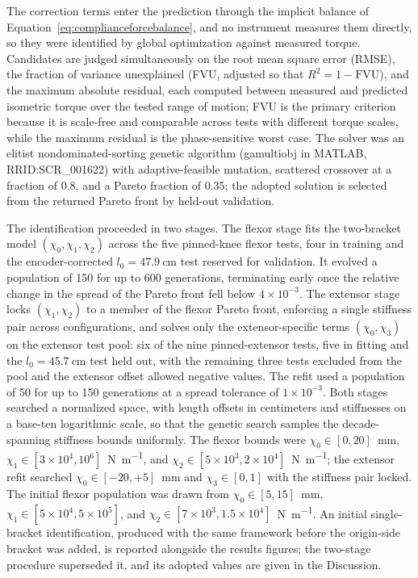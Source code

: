 The correction terms enter the prediction through the implicit balance of Equation~\eqref{eq:complianceforcebalance}, and no instrument measures them directly, so they were identified by global optimization against measured torque. Candidates are judged simultaneously on the root mean square error (RMSE), the fraction of variance unexplained (FVU, adjusted so that $R^{2} = 1 - \mathrm{FVU}$), and the maximum absolute residual, each computed between measured and predicted isometric torque over the tested range of motion; FVU is the primary criterion because it is scale-free and comparable across tests with different torque scales, while the maximum residual is the phase-sensitive worst case. The solver was an elitist nondominated-sorting genetic algorithm (gamultiobj in MATLAB, RRID:SCR\_001622) with adaptive-feasible mutation, scattered crossover at a fraction of 0.8, and a Pareto fraction of 0.35; the adopted solution is selected from the returned Pareto front by held-out validation.

The identification proceeded in two stages. The flexor stage fits the two-bracket model $(\chi_{0}, \chi_{1}, \chi_{2})$ across the five pinned-knee flexor tests, four in training and the encoder-corrected $l_{0}=\qty{47.9}{\cm}$ test reserved for validation. It evolved a population of 150 for up to 600 generations, terminating early once the relative change in the spread of the Pareto front fell below $4\times10^{-3}$. The extensor stage locks $(\chi_{1}, \chi_{2})$ to a member of the flexor Pareto front, enforcing a single stiffness pair across configurations, and solves only the extensor-specific terms $(\chi_{0}, \chi_{3})$ on the extensor test pool: six of the nine pinned-extensor tests, five in fitting and the $l_{0}=\qty{45.7}{\cm}$ test held out, with the remaining three tests excluded from the pool and the extensor offset allowed negative values. The refit used a population of 50 for up to 150 generations at a spread tolerance of $1\times10^{-3}$. Both stages searched a normalized space, with length offsets in centimeters and stiffnesses on a base-ten logarithmic scale, so that the genetic search samples the decade-spanning stiffness bounds uniformly. The flexor bounds were $\chi_{0} \in [0, 20]$~\si{\milli\metre}, $\chi_{1} \in [3\times10^{4}, 10^{6}]$~\si{\N\per\metre}, and $\chi_{2} \in [5\times10^{3}, 2\times10^{4}]$~\si{\N\per\metre}; the extensor refit searched $\chi_{0} \in [-20, +5]$~\si{\milli\metre} and $\chi_{3} \in [0, 1]$ with the stiffness pair locked. The initial flexor population was drawn from $\chi_{0} \in [5, 15]$~\si{\milli\metre}, $\chi_{1} \in [5\times10^{4}, 5\times10^{5}]$, and $\chi_{2} \in [7\times10^{3}, 1.5\times10^{4}]$~\si{\N\per\metre}. An initial single-bracket identification, produced with the same framework before the origin-side bracket was added, is reported alongside the results figures; the two-stage procedure superseded it, and its adopted values are given in the Discussion.

